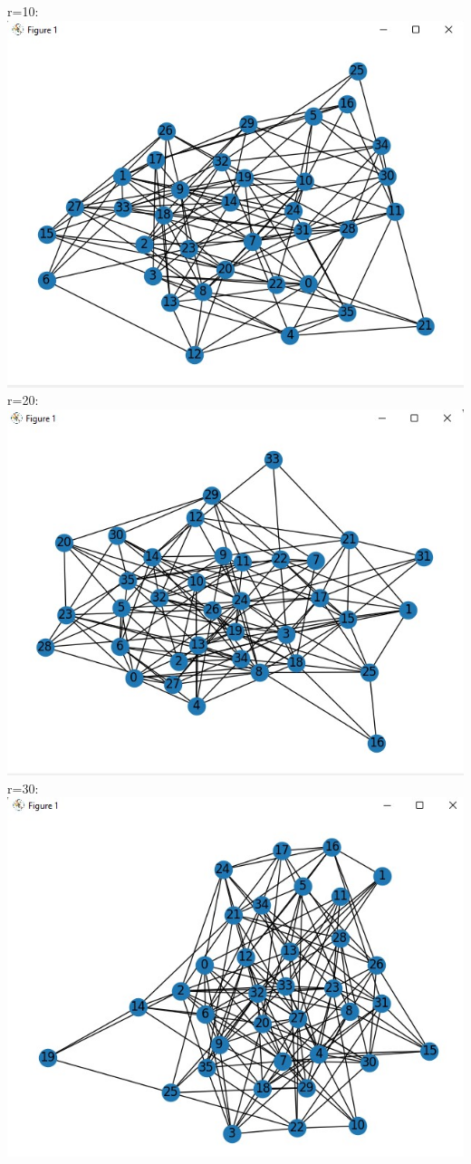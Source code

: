 \documentclass[answers]{exam}
\begin{document}
\begin{questions}
\begin{framed}
r=10:\\\includegraphics[width=10 cm]{first conf 10.jpg}\\
r=20:\\\includegraphics[width=10 cm]{first conf 20.jpg}\\
r=30:\\ \includegraphics[width=10 cm]{first conf 30.jpg}\\\\

\end{framed}
\end{questions}
\end{document}
